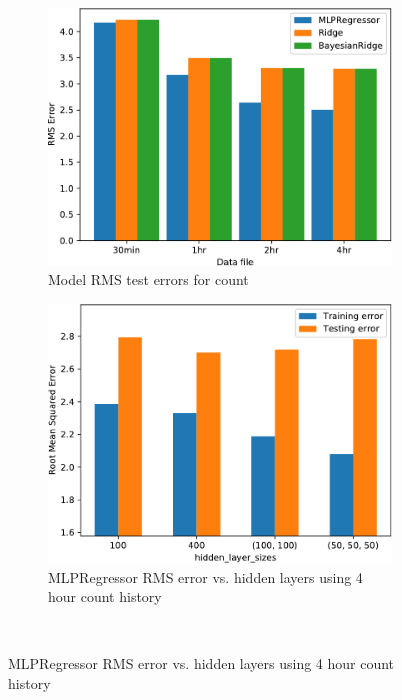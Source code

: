 \begin{figure}[!ht]\centering
    \begin{subfigure}[t]{.475\linewidth}\centering
        \includegraphics[width=1\linewidth]{./figures/Ch4fig5a}
        \caption{Model RMS test errors for count}\label{Ch4Fig:3a}
    \end{subfigure}\hfill%
    \begin{subfigure}[t]{.475\linewidth}\centering
        \includegraphics[width=1\linewidth]{./figures/Ch4fig5b}
        \caption{MLPRegressor RMS error vs. hidden layers using 4 hour count history}\label{Ch4Fig:3b}
    \end{subfigure}\\

\end{figure}
